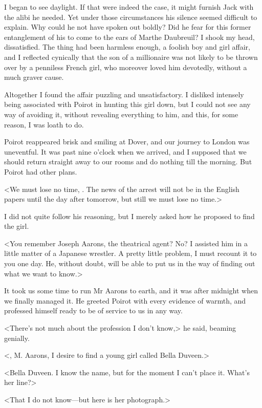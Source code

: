  I began to see daylight. If that were indeed the case, it might furnish Jack with the alibi he needed. Yet under those circumstances his silence seemed difficult to explain. Why could he not have spoken out boldly? Did he fear for this former entanglement of his to come to the ears of Marthe Daubreuil? I shook my head, dissatisfied. The thing had been harmless enough, a foolish boy and girl affair, and I reflected cynically that the son of a millionaire was not likely to be thrown over by a penniless French girl, who moreover loved him devotedly, without a much graver cause. 

 Altogether I found the affair puzzling and unsatisfactory. I disliked intensely being associated with Poirot in hunting this girl down, but I could not see any way of avoiding it, without revealing everything to him, and this, for some reason, I was loath to do. 

 Poirot reappeared brisk and smiling at Dover, and our journey to London was uneventful. It was past nine o'clock when we arrived, and I supposed that we should return straight away to our rooms and do nothing till the morning. But Poirot had other plans. 

 <We must lose no time, . The news of the arrest will not be in the English papers until the day after tomorrow, but still we must lose no time.> 

 I did not quite follow his reasoning, but I merely asked how he proposed to find the girl. 

 <You remember Joseph Aarons, the theatrical agent? No? I assisted him in a little matter of a Japanese wrestler. A pretty little problem, I must recount it to you one day. He, without doubt, will be able to put us in the way of finding out what we want to know.> 

 It took us some time to run Mr Aarons to earth, and it was after midnight when we finally managed it. He greeted Poirot with every evidence of warmth, and professed himself ready to be of service to us in any way. 

 <There's not much about the profession I don't know,> he said, beaming genially. 

 <, M. Aarons, I desire to find a young girl called Bella Duveen.> 

 <Bella Duveen. I know the name, but for the moment I can't place it. What's her line?> 

 <That I do not know—but here is her photograph.> 

